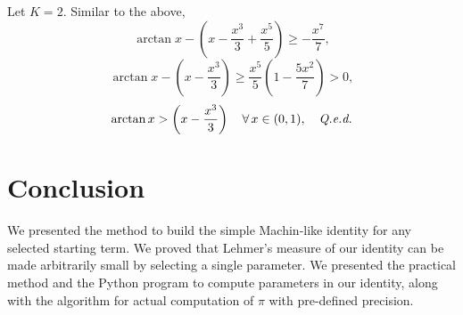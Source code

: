 \documentclass[draft, 10pt]{article} %
\begin{document}
Let $K=2$. Similar to the above,
$$
\arctan x - \left( x - \dfrac{x^3}{3} + \dfrac{x^5}{5} \right) \ge -\dfrac{x^7}{7},
$$
$$
\arctan x - \left( x - \dfrac{x^3}{3} \right) \ge
    \dfrac{x^5}{5} \left( 1 - \dfrac{5x^2}{7} \right) > 0,
$$
$$
\arctan x > \left( x - \dfrac{x^3}{3} \right) \quad \forall\, x \in (0,1),
    \quad\hbox{\qed}
$$

\section{Conclusion}

We presented the method to build the simple Machin-like identity for any selected
starting term. We proved that Lehmer's measure of our identity can be made
arbitrarily small by selecting a single parameter. We presented the practical method and
the Python program to compute parameters in our identity, along with the algorithm
for actual computation of $\pi$ with pre-defined precision.
 
%
%
%
\end{document}
